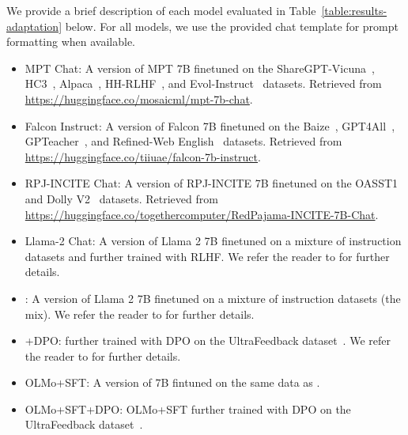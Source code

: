 We provide a brief description of each model evaluated in Table~\ref{table:results-adaptation} below. For all models, we use the provided chat template for prompt formatting when available. 
\begin{itemize}[leftmargin=*]
    \item MPT Chat: A version of MPT 7B finetuned on the ShareGPT-Vicuna~\citep{vicuna2023}, HC3~\citep{guo-etal-2023-hc3}, Alpaca~\citep{alpaca}, HH-RLHF~\citep{bai2022training}, and Evol-Instruct~\citep{xu2024wizardlm} datasets. Retrieved from \url{https://huggingface.co/mosaicml/mpt-7b-chat}.
    \item Falcon Instruct: A version of Falcon 7B finetuned on the Baize~\citep{xu2023baize}, GPT4All~\citep{gpt4all}, GPTeacher~\citep{gpteacher}, and Refined-Web English~\citep{penedo2023therd} datasets. Retrieved from \url{https://huggingface.co/tiiuae/falcon-7b-instruct}.
    \item RPJ-INCITE Chat: A version of RPJ-INCITE 7B finetuned on the OASST1~\citep{kopf2023openassistant} and Dolly V2~\citep{DatabricksBlog2023DollyV2} datasets. Retrieved from \url{https://huggingface.co/togethercomputer/RedPajama-INCITE-7B-Chat}.
    \item Llama-2 Chat: A version of Llama 2 7B finetuned on a mixture of instruction datasets and further trained with RLHF. We refer the reader to \citet{touvron2023llama2} for further details.
    \item {}: A version of Llama 2 7B finetuned on a mixture of instruction datasets (the  mix). We refer the reader to \citet{ivison2023camels} for further details.
    \item {}+DPO:  further trained with DPO on the UltraFeedback dataset~\citep{cui2023ultrafeedback}. We refer the reader to \citet{ivison2023camels} for further details.
    \item OLMo+SFT: A version of \olmo 7B fintuned on the same data as .
    \item OLMo+SFT+DPO: OLMo+SFT further trained with DPO on the UltraFeedback dataset~\citep{cui2023ultrafeedback}.
\end{itemize}

